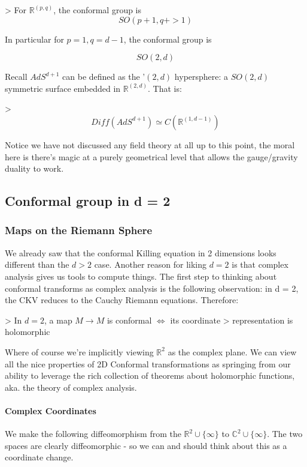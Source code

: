 >  For $\mathbb{R}^{(p, q)}$, the conformal group is  $$SO(p + 1, q +
> 1)$$

In particular for $p= 1, q = d - 1$, the conformal group is

$$SO(2, d)$$

Recall $AdS^{d+1}$ can be defined as the '$(2,d)$ hypersphere: a $ SO(2, d)$ symmetric surface embedded in $\mathbb{R}^{(2,d)}$. That is:

> $$Diff(AdS^{d+1}) \simeq C({\mathbb{R}^{(1, d-1)}})$$

Notice we have not discussed any field theory at all up to this point, the moral here is there's magic at a purely geometrical level that allows the gauge/gravity duality to work.


\subsection{ Conformal group in d = 2}

\subsubsection{ Maps on the Riemann Sphere}

We already saw that the conformal Killing equation in 2 dimensions looks different than the $d>2$ case. Another reason for liking $d=2$ is that complex analysis gives us tools to compute things. The first step to thinking about conformal transforms as complex analysis is the following observation: in d = 2, the CKV reduces to the Cauchy Riemann equations. Therefore:

> In $d = 2$, a map $M \to M$ is conformal $\iff$ its coordinate
> representation is holomorphic


Where of course we're implicitly viewing $\mathbb{R}^2$ as the complex plane. We can view all the nice properties of 2D Conformal transformations as springing from our ability to leverage the rich collection of theorems about holomorphic functions, aka. the theory of complex analysis.

\paragraph{ Complex Coordinates}

We make the following diffeomorphism from the $\mathbb{R}^2 \cup \{ \infty \}$ to $\mathbb{C}^2 \cup \{ \infty \}$. The two spaces are clearly diffeomorphic - so we can and should think about this as a coordinate change.

